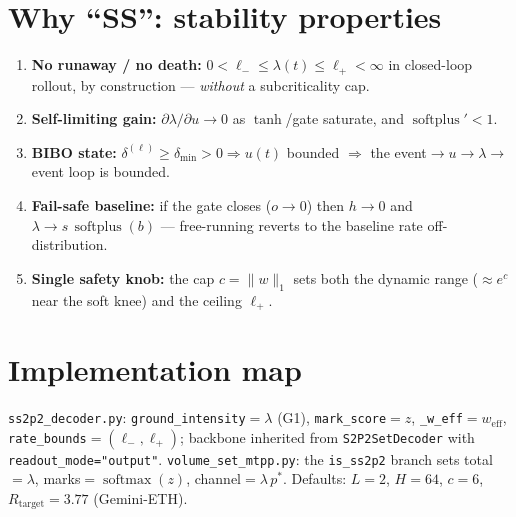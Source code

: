 \documentclass[11pt]{article}
\newcommand{\softplus}{\operatorname{softplus}}
\newcommand{\softmax}{\operatorname{softmax}}
\begin{document}
\section{Why ``SS'': stability properties}
\begin{enumerate}[leftmargin=1.5em,itemsep=1.5pt]
\item \textbf{No runaway / no death:} $0<\ell_-\le\lambda(t)\le\ell_+<\infty$ in closed-loop rollout,
by construction — \emph{without} a subcriticality cap.
\item \textbf{Self-limiting gain:} $\partial\lambda/\partial u\to0$ as $\tanh$/gate saturate, and
$\softplus'<1$.
\item \textbf{BIBO state:} $\delta^{(\ell)}\ge\delta_{\min}>0\Rightarrow u(t)$ bounded $\Rightarrow$ the
event$\to u\to\lambda\to$event loop is bounded.
\item \textbf{Fail-safe baseline:} if the gate closes ($o\to0$) then $h\to0$ and
$\lambda\to s\,\softplus(b)$ — free-running reverts to the baseline rate off-distribution.
\item \textbf{Single safety knob:} the cap $c=\lVert w\rVert_1$ sets both the dynamic range
($\approx e^{c}$ near the soft knee) and the ceiling $\ell_+$.
\end{enumerate}

\section*{Implementation map}
\noindent\footnotesize
\texttt{ss2p2\_decoder.py}: \texttt{ground\_intensity}$=\lambda$ (G1), \texttt{mark\_score}$=z$,
\texttt{\_w\_eff}$=w_{\mathrm{eff}}$, \texttt{rate\_bounds}$=(\ell_-,\ell_+)$; backbone inherited from
\texttt{S2P2SetDecoder} with \texttt{readout\_mode="output"}.\;
\texttt{volume\_set\_mtpp.py}: the \texttt{is\_ss2p2} branch sets
total$=\lambda$, marks$=\softmax(z)$, channel$=\lambda\,p^*$.\;
Defaults: $L{=}2$, $H{=}64$, $c{=}6$, $R_{\mathrm{target}}{=}3.77$ (Gemini-ETH).
\end{document}
